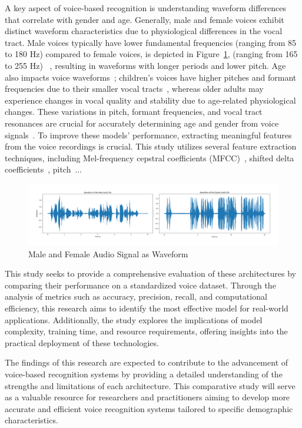 \documentclass[conference, 10pt,onecolumn]{IEEEtran}
\begin{document}
A key aspect of voice-based recognition is understanding waveform differences that correlate with gender and age. Generally, male and female voices exhibit distinct waveform characteristics due to physiological differences in the vocal tract. Male voices typically have lower fundamental frequencies (ranging from 85 to 180 Hz) compared to female voices, is depicted in Figure~\ref{fig:Dataset-Male-Female}, (ranging from 165 to 255 Hz) ~\cite{hanson1999glottal}, resulting in waveforms with longer periods and lower pitch. Age also impacts voice waveforms~\cite{dehqan2013effects}; children's voices have higher pitches and formant frequencies due to their smaller vocal tracts~\cite{lee1999acoustics}, whereas older adults may experience changes in vocal quality and stability due to age-related physiological changes. These variations in pitch, formant frequencies, and vocal tract resonances are crucial for accurately determining age and gender from voice signals~\cite{kent1992acoustic}. To improve these models' performance, extracting meaningful features from the voice recordings is crucial. This study utilizes several feature extraction techniques, including Mel-frequency cepstral coefficients (MFCC)~\cite{1163420}, shifted delta coefficients~\cite{torres2002approaches}, pitch~\cite{yang2016pitch}...


\begin{figure}
    \centering
    \includegraphics[width=6 in]{Male and Female audio.pdf}
    \caption{Male and Female Audio Signal as Waveform}
    \label{fig:Dataset-Male-Female}
\end{figure}

This study seeks to provide a comprehensive evaluation of these architectures by comparing their performance on a standardized voice dataset. Through the analysis of metrics such as accuracy, precision, recall, and computational efficiency, this research aims to identify the most effective model for real-world applications. Additionally, the study explores the implications of model complexity, training time, and resource requirements, offering insights into the practical deployment of these technologies.

The findings of this research are expected to contribute to the advancement of voice-based recognition systems by providing a detailed understanding of the strengths and limitations of each architecture. This comparative study will serve as a valuable resource for researchers and practitioners aiming to develop more accurate and efficient voice recognition systems tailored to specific demographic characteristics.
\end{document}
